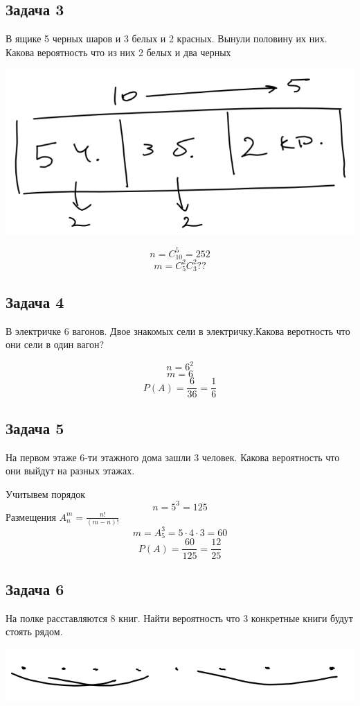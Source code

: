 \documentclass[english]{article}
\theoremstyle{plain}
\theoremstyle{remark}
\theoremstyle{definition}
\begin{document}
\subsection{Задача 3}
\label{sec:org6f58378}
В ящике 5 черных шаров и 3 белых и 2 красных. Вынули половину их них. Какова вероятность что из них 2 белых и два черных

\begin{center}
\includegraphics[width=.9\linewidth]{1_3.png}
\end{center}

\[ n = C^5_{10} = 252 \]
\[ m = C^2_5C^2_3 ?? \]


\subsection{Задача 4}
\label{sec:org698a2fa}
В электричке 6 вагонов. Двое знакомых сели в электричку.\color{red}Какова веротность что они сели в один вагон?\color{black}

\[ n = 6^2 \]
\[ m = 6 \]
\[ P(A) = \frac{6}{36} = \frac{1}{6} \]

\subsection{Задача 5}
\label{sec:org4377568}
На первом этаже 6-ти этажного дома зашли 3 человек. Какова вероятность что они выйдут на разных этажах.

Учитывем порядок
\[ n = 5^3 = 125 \]
Размещения \(A^m_n = \frac{n!}{(m - n)!}\)
\[ m =  A^3_5 = 5\cdot 4\cdot 3 = 60 \]
\[ P(A) = \frac{60}{125} = \frac{12}{25} \]

\subsection{Задача 6}
\label{sec:org6e4ef4c}
На полке расставляются 8 книг. Найти вероятность что 3 конкретные книги будут стоять рядом.

\begin{center}
\includegraphics[width=.9\linewidth]{1_6.png}
\end{center}
\end{document}
